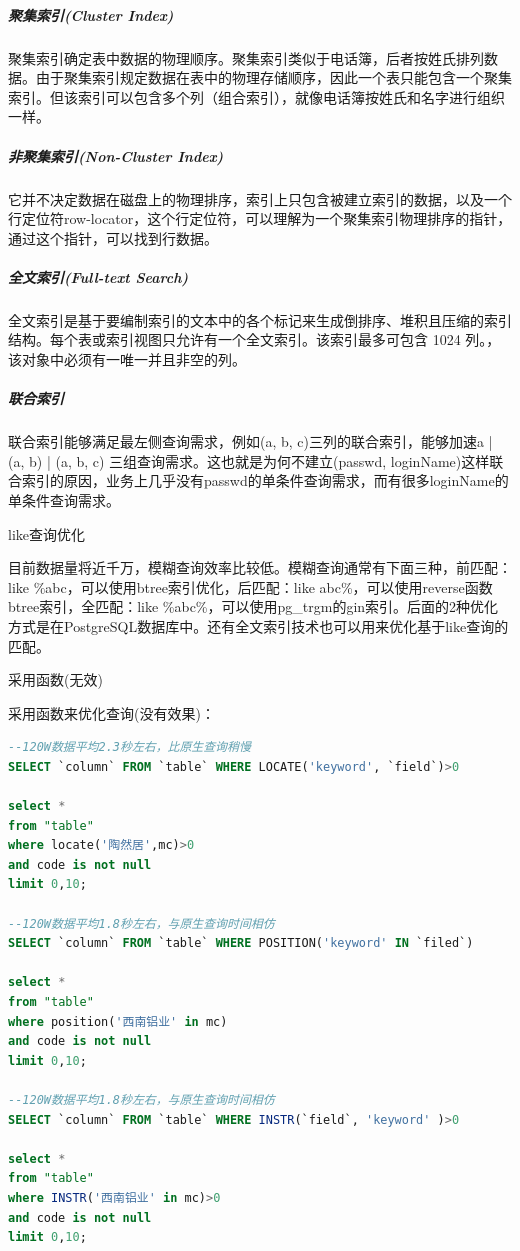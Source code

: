 \documentclass[12pt]{book}
\makeatletter
\numberwithin{dummy}{section}
\theoremstyle{ocrenumbox}
\theoremstyle{blacknumex}
\theoremstyle{blacknumbox}
\theoremstyle{ocrenum}
\renewcommand{\subsection}{\@startsection {subsection}{2}{\z@}
	{-3ex \@plus -0.1ex \@minus -.4ex}
	{0.5ex \@plus.2ex }
	{\normalfont\sffamily\bfseries}}
\renewcommand\paragraph{\@startsection{paragraph}{4}{\z@}
	{-2ex \@plus-.2ex \@minus .2ex}
	{.1ex}
	{\normalfont\small\sffamily\bfseries}}
\makeatother
\begin{document}
\subparagraph{聚集索引(Cluster Index)}

聚集索引确定表中数据的物理顺序。聚集索引类似于电话簿，后者按姓氏排列数据。由于聚集索引规定数据在表中的物理存储顺序，因此一个表只能包含一个聚集索引。但该索引可以包含多个列（组合索引），就像电话簿按姓氏和名字进行组织一样。 

\subparagraph{非聚集索引(Non-Cluster Index)}

它并不决定数据在磁盘上的物理排序，索引上只包含被建立索引的数据，以及一个行定位符row-locator，这个行定位符，可以理解为一个聚集索引物理排序的指针，通过这个指针，可以找到行数据。

\subparagraph{全文索引(Full-text Search)}

全文索引是基于要编制索引的文本中的各个标记来生成倒排序、堆积且压缩的索引结构。每个表或索引视图只允许有一个全文索引。该索引最多可包含 1024 列。，该对象中必须有一唯一并且非空的列。 

\subparagraph{联合索引}

联合索引能够满足最左侧查询需求，例如(a, b, c)三列的联合索引，能够加速a | (a, b) | (a, b, c) 三组查询需求。这也就是为何不建立(passwd, loginName)这样联合索引的原因，业务上几乎没有passwd的单条件查询需求，而有很多loginName的单条件查询需求。

\subsection{like查询优化}

目前数据量将近千万，模糊查询效率比较低。模糊查询通常有下面三种，前匹配：like \%abc，可以使用btree索引优化，后匹配：like abc\%，可以使用reverse函数btree索引，全匹配：like \%abc\%，可以使用pg\_trgm的gin索引。后面的2种优化方式是在PostgreSQL数据库中。还有全文索引技术也可以用来优化基于like查询的匹配。

\paragraph{采用函数(无效)}

采用函数来优化查询(没有效果)：

\begin{lstlisting}[language=SQL]
--120W数据平均2.3秒左右，比原生查询稍慢
SELECT `column` FROM `table` WHERE LOCATE('keyword', `field`)>0

select * 
from "table" 
where locate('陶然居',mc)>0
and code is not null
limit 0,10;

--120W数据平均1.8秒左右，与原生查询时间相仿
SELECT `column` FROM `table` WHERE POSITION('keyword' IN `filed`)

select * 
from "table" 
where position('西南铝业' in mc)
and code is not null
limit 0,10;

--120W数据平均1.8秒左右，与原生查询时间相仿
SELECT `column` FROM `table` WHERE INSTR(`field`, 'keyword' )>0

select * 
from "table" 
where INSTR('西南铝业' in mc)>0
and code is not null
limit 0,10;
\end{lstlisting}
\end{document}
